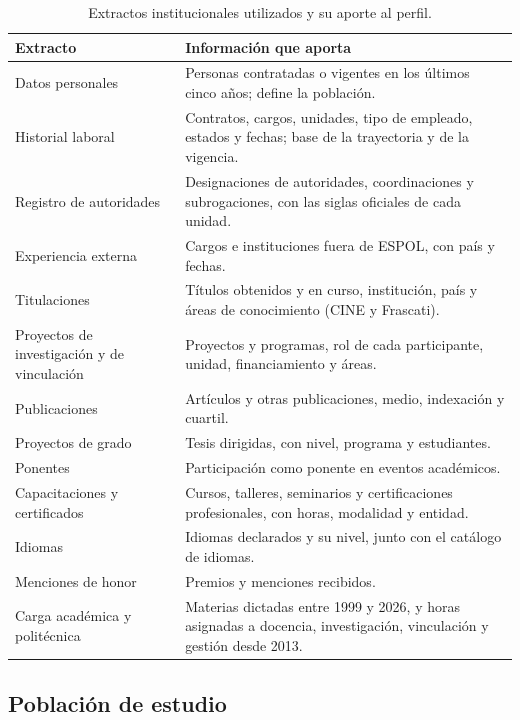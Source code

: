 \begin{table}[!htbp]
    \centering
    \caption{Extractos institucionales utilizados y su aporte al perfil.}
    \label{tab:fuentes}
    \small
    \begin{tabular}{p{4.6cm} p{10.2cm}}
        \toprule
        \textbf{Extracto} & \textbf{Información que aporta} \\
        \midrule
        Datos personales & Personas contratadas o vigentes en los últimos cinco años; define la población. \\
        Historial laboral & Contratos, cargos, unidades, tipo de empleado, estados y fechas; base de la trayectoria y de la vigencia. \\
        Registro de autoridades & Designaciones de autoridades, coordinaciones y subrogaciones, con las siglas oficiales de cada unidad. \\
        Experiencia externa & Cargos e instituciones fuera de ESPOL, con país y fechas. \\
        Titulaciones & Títulos obtenidos y en curso, institución, país y áreas de conocimiento (CINE y Frascati). \\
        Proyectos de investigación y de vinculación & Proyectos y programas, rol de cada participante, unidad, financiamiento y áreas. \\
        Publicaciones & Artículos y otras publicaciones, medio, indexación y cuartil. \\
        Proyectos de grado & Tesis dirigidas, con nivel, programa y estudiantes. \\
        Ponentes & Participación como ponente en eventos académicos. \\
        Capacitaciones y certificados & Cursos, talleres, seminarios y certificaciones profesionales, con horas, modalidad y entidad. \\
        Idiomas & Idiomas declarados y su nivel, junto con el catálogo de idiomas. \\
        Menciones de honor & Premios y menciones recibidos. \\
        Carga académica y politécnica & Materias dictadas entre 1999 y 2026, y horas asignadas a docencia, investigación, vinculación y gestión desde 2013. \\
        \bottomrule
    \end{tabular}
\end{table}

\subsection{Población de estudio}
\label{sec:met_poblacion}

